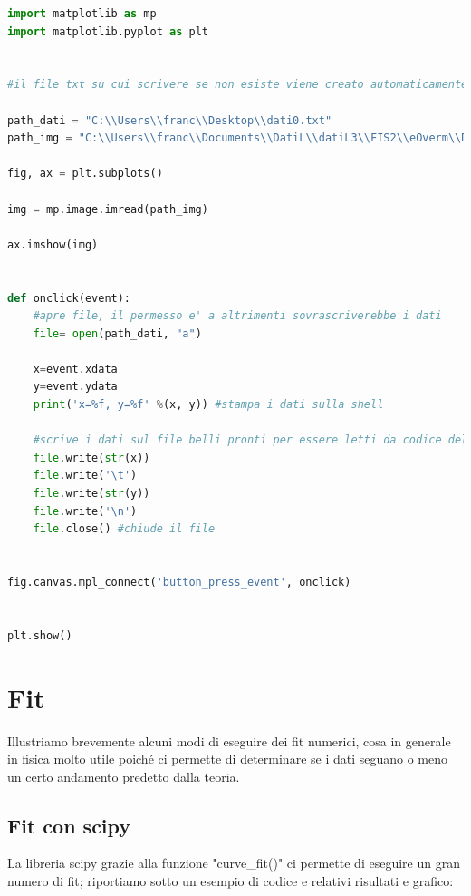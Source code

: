 \documentclass[10pt,a4paper]{article}
\begin{document}
\begin{lstlisting}[language=Python]
import matplotlib as mp
import matplotlib.pyplot as plt


#il file txt su cui scrivere se non esiste viene creato automaticamente

path_dati = "C:\\Users\\franc\\Desktop\\dati0.txt"
path_img = "C:\\Users\\franc\\Documents\\DatiL\\datiL3\\FIS2\\eOverm\\DSC_0005.jpg"

fig, ax = plt.subplots()

img = mp.image.imread(path_img)

ax.imshow(img)


def onclick(event):
    #apre file, il permesso e' a altrimenti sovrascriverebbe i dati
    file= open(path_dati, "a")

    x=event.xdata
    y=event.ydata
    print('x=%f, y=%f' %(x, y)) #stampa i dati sulla shell

    #scrive i dati sul file belli pronti per essere letti da codice del fit
    file.write(str(x))
    file.write('\t')
    file.write(str(y))
    file.write('\n')
    file.close() #chiude il file


fig.canvas.mpl_connect('button_press_event', onclick)


plt.show()

\end{lstlisting}

\newpage

\section{Fit}
Illustriamo brevemente alcuni modi di eseguire dei fit numerici, cosa in generale in fisica molto utile poiché ci permette di determinare se i dati seguano o meno un certo andamento predetto dalla teoria.
\subsection{Fit con scipy}
La libreria scipy grazie alla funzione "curve\_fit()" ci permette di eseguire un gran numero di fit; riportiamo sotto un esempio di codice e relativi risultati e grafico:
\end{document}
